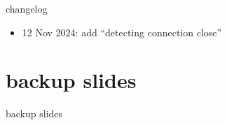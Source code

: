 \date{}
\title{}
\date{}

\begin{frame}
    \titlepage
\end{frame}

{\changelogmode
\begin{frame}{changelog}
    \begin{itemize}
    \item 12 Nov 2024: add ``detecting connection close''
    \end{itemize}
\end{frame}
}





\section{backup slides}
\begin{frame}{backup slides}
\end{frame}


